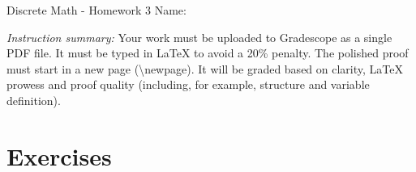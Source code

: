 \documentclass[12pt]{article}
\begin{document}
\begin{center}
    {\LARGE Discrete Math - Homework 3} \Large \newline
    Name:
\end{center}

\vspace{1em}

\noindent \emph{Instruction summary:} Your work must be uploaded to Gradescope as a single PDF file. It must be typed in LaTeX to avoid a 20\% penalty. The polished proof must start in a new page (\textbackslash{newpage}). It will be graded based on clarity, LaTeX prowess and proof quality (including, for example, structure and variable definition).

\section*{Exercises}
\end{document}
